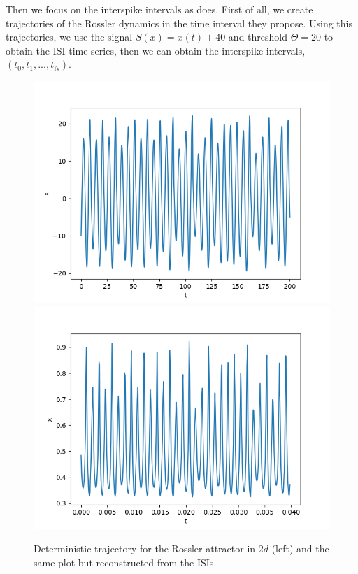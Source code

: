 \documentclass[10pt]{article}
\begin{document}
Then we focus on the interspike intervals as \cite{interspike} does. First of all, we create trajectories of the Rossler dynamics in the time interval they propose. Using this trajectories, we use the signal $S(x)=x(t)+40$ and threshold $\Theta=20$ to obtain the ISI time series, then we can obtain the interspike intervals, $(t_0,t_1,...,t_N)$.

\begin{figure}[h!]
\centering
\includegraphics[scale=0.45]{real_trajectory_rossler} \includegraphics[scale=0.45]{reconstructed_trajectory_rossler}
\caption{Deterministic trajectory for the Rossler attractor in $2d$ (left) and the same plot but reconstructed from the ISIs.}
\label{fig:rossler_xprima}
\end{figure}
\end{document}
